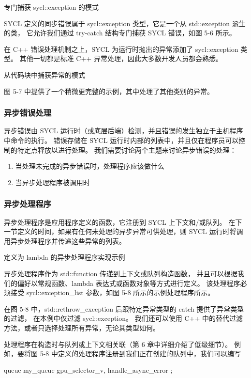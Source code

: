 {\color{red} 专门捕获 sycl::exception 的模式}

SYCL 定义的同步错误属于 sycl::exception 类型，它是一个从 std::exception 派生的类，
它允许我们通过 try-catch 结构专门捕获 SYCL 错误，如图 5-6 所示。

在 C++ 错误处理机制之上，SYCL 为运行时抛出的异常添加了 sycl::exception 类型。 
其他一切都是标准 C++ 异常处理，因此大多数开发人员都会熟悉。

{\color{red} 从代码块中捕获异常的模式}

图 5-7 中提供了一个稍微更完整的示例，其中处理了其他类别的异常。

\subsubsection{异步错误处理}
异步错误由 SYCL 运行时（或底层后端）检测，并且错误的发生独立于主机程序中命令的执行。 
错误存储在 SYCL 运行时内部的列表中，并且仅在程序员可以控制的特定点释放以进行处理。 
我们需要讨论两个主题来讨论异步错误的处理：

\begin{enumerate}
	\item 当处理未完成的异步错误时，处理程序应该做什么
	\item 当异步处理程序被调用时
\end{enumerate}

\subsubsection{异步处理程序}
异步处理程序是应用程序定义的函数，它注册到 SYCL 上下文和/或队列。 
在下一节定义的时间，如果有任何未处理的异步异常可供处理，则 SYCL 运行时将调用异步处理程序并传递这些异常的列表。

{\color{red} 定义为 lambda 的异步处理程序实现示例}

异步处理程序作为 std::function 传递到上下文或队列构造函数，
并且可以根据我们的偏好以常规函数、lambda 表达式或函数对象等方式进行定义。 
该处理程序必须接受 sycl::exception\_list 参数，如图 5-8 所示的示例处理程序所示。

在图 5-8 中，std::rethrow\_exception 后跟特定异常类型的 catch 提供了异常类型的过滤，
在本例中仅过滤 sycl::exception。 我们还可以使用 C++ 中的替代过滤方法，或者只选择处理所有异常，无论其类型如何。

处理程序在构造时与队列或上下文相关联（第 6 章中详细介绍了低级细节）。 
例如，要将图 5-8 中定义的处理程序注册到我们正在创建的队列中，我们可以编写

queue my\_queue{ gpu\_selector\_v, handle\_async\_error };

